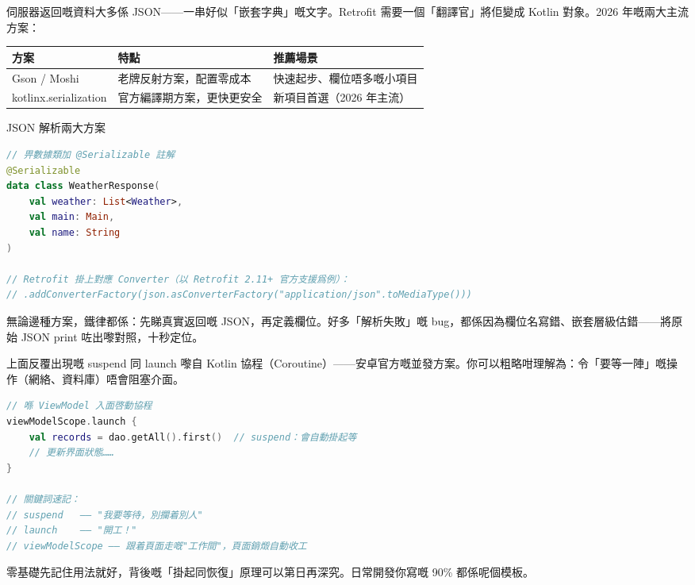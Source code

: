 
伺服器返回嘅資料大多係 JSON——一串好似「嵌套字典」嘅文字。Retrofit 需要一個「翻譯官」將佢變成 Kotlin 對象。2026 年嘅兩大主流方案：

\begin{center}
\begin{tabularx}{\linewidth}{|X|X|X|}
\hline
\textbf{方案} & \textbf{特點} & \textbf{推薦場景} \tabularnewline
\hline
Gson / Moshi & 老牌反射方案，配置零成本 & 快速起步、欄位唔多嘅小項目 \tabularnewline
kotlinx.serialization & 官方編譯期方案，更快更安全 & 新項目首選（2026 年主流） \tabularnewline
\hline
\end{tabularx}
\end{center}

\begin{center}\small\color{gray}JSON 解析兩大方案\end{center}

\begin{lstlisting}[language=Kotlin]
// 畀數據類加 @Serializable 註解
@Serializable
data class WeatherResponse(
    val weather: List<Weather>,
    val main: Main,
    val name: String
)

// Retrofit 掛上對應 Converter（以 Retrofit 2.11+ 官方支援爲例）：
// .addConverterFactory(json.asConverterFactory("application/json".toMediaType()))
\end{lstlisting}

無論邊種方案，鐵律都係：先睇真實返回嘅 JSON，再定義欄位。好多「解析失敗」嘅 bug，都係因為欄位名寫錯、嵌套層級估錯——將原始 JSON print 咗出嚟對照，十秒定位。



上面反覆出現嘅 suspend 同 launch 嚟自 Kotlin 協程（Coroutine）——安卓官方嘅並發方案。你可以粗略咁理解為：令「要等一陣」嘅操作（網絡、資料庫）唔會阻塞介面。

\begin{lstlisting}[language=Kotlin]
// 喺 ViewModel 入面啓動協程
viewModelScope.launch {
    val records = dao.getAll().first()  // suspend：會自動掛起等
    // 更新界面狀態……
}

// 關鍵詞速記：
// suspend   —— "我要等待，別攔着別人"
// launch    —— "開工！"
// viewModelScope —— 跟着頁面走嘅"工作間"，頁面銷燬自動收工
\end{lstlisting}

零基礎先記住用法就好，背後嘅「掛起同恢復」原理可以第日再深究。日常開發你寫嘅 90\% 都係呢個模板。

